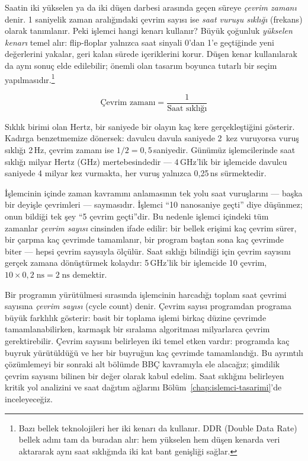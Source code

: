 Saatin iki yükselen ya da iki düşen darbesi arasında geçen süreye \emph{çevrim zamanı} denir. 1 saniyelik zaman aralığındaki çevrim sayısı ise \emph{saat vuruşu sıklığı} (frekans) olarak tanımlanır. Peki işlemci hangi kenarı kullanır? Büyük çoğunluk \emph{yükselen kenarı} temel alır: flip-floplar yalnızca saat sinyali 0'dan 1'e geçtiğinde yeni değerlerini yakalar, geri kalan sürede içeriklerini korur. Düşen kenar kullanılarak da aynı sonuç elde edilebilir; önemli olan tasarım boyunca tutarlı bir seçim yapılmasıdır.\footnote{Bazı bellek teknolojileri her iki kenarı da kullanır. DDR (Double Data Rate) bellek adını tam da buradan alır: hem yükselen hem düşen kenarda veri aktararak aynı saat sıklığında iki kat bant genişliği sağlar.}

\begin{equation}
\text{Çevrim zamanı} = \frac{1}{\text{Saat sıklığı}}
\label{eq:cevrim-zamani}
\end{equation}

Sıklık birimi olan Hertz, bir saniyede bir olayın kaç kere gerçekleştiğini gösterir. Kadırga benzetmemize dönersek: davulcu davula saniyede 2~kez vuruyorsa vuruş sıklığı 2\,Hz, çevrim zamanı ise $1/2 = 0{,}5$\,saniyedir. Günümüz işlemcilerinde saat sıklığı milyar Hertz (GHz) mertebesindedir --- 4\,GHz'lik bir işlemcide davulcu saniyede 4 milyar kez vurmakta, her vuruş yalnızca 0,25\,ns sürmektedir.

İşlemcinin içinde zaman kavramını anlamasının tek yolu saat vuruşlarını --- başka bir deyişle çevrimleri --- saymasıdır. İşlemci ``10 nanosaniye geçti'' diye düşünmez; onun bildiği tek şey ``5 çevrim geçti''dir. Bu nedenle işlemci içindeki tüm zamanlar \emph{çevrim sayısı} cinsinden ifade edilir: bir bellek erişimi kaç çevrim sürer, bir çarpma kaç çevrimde tamamlanır, bir program baştan sona kaç çevrimde biter --- hepsi çevrim sayısıyla ölçülür. Saat sıklığı bilindiği için çevrim sayısını gerçek zamana dönüştürmek kolaydır: 5\,GHz'lik bir işlemcide 10 çevrim, $10 \times 0{,}2\;\text{ns} = 2\;\text{ns}$ demektir.

Bir programın yürütülmesi sırasında işlemcinin harcadığı toplam saat çevrimi sayısına \emph{çevrim sayısı} (cycle count) denir. Çevrim sayısı programdan programa büyük farklılık gösterir: basit bir toplama işlemi birkaç düzine çevrimde tamamlanabilirken, karmaşık bir sıralama algoritması milyarlarca çevrim gerektirebilir. Çevrim sayısını belirleyen iki temel etken vardır: programda kaç buyruk yürütüldüğü ve her bir buyruğun kaç çevrimde tamamlandığı. Bu ayrıntılı çözümlemeyi bir sonraki alt bölümde BBÇ kavramıyla ele alacağız; şimdilik çevrim sayısını bilinen bir değer olarak kabul edelim. Saat sıklığını belirleyen kritik yol analizini ve saat dağıtım ağlarını Bölüm~\ref{chap:islemci-tasarimi}'de inceleyeceğiz.

